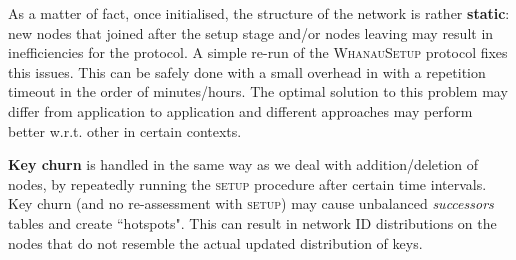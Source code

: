 As a matter of fact, once initialised, the structure of the network is rather \textbf{static}: new nodes that joined after the setup stage and/or nodes leaving may result in inefficiencies for the protocol. A simple re-run of the \textsc{WhanauSetup} protocol fixes this issues. This can be safely done with a small overhead in with a repetition timeout in the order of minutes/hours. The optimal solution to this problem may differ from application to application and different approaches may perform better w.r.t. other in certain contexts.

\textbf{Key churn} is handled in the same way as we deal with addition/deletion of nodes, by repeatedly running the \textsc{setup} procedure after certain time intervals. Key churn (and no re-assessment with \textsc{setup}) may cause unbalanced \textit{successors} tables and create ``hotspots". This can result in network ID distributions on the nodes that do not resemble the actual updated distribution of keys.